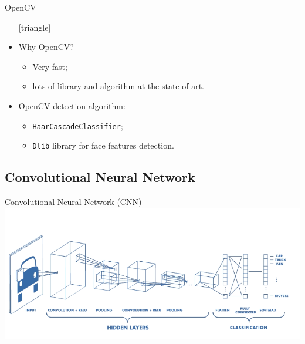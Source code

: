 \documentclass{beamer}
\begin{document}
\begin{frame}{OpenCV}
	\begin{itemize}
		\setlength\itemsep{1em}
		[triangle]
		\item
			Why OpenCV?
			\begin{itemize}
				[circle]
				\item 
					Very fast;
				\item 
					lots of library and algorithm at the state-of-art.
			\end{itemize}
		\item 
			OpenCV detection algorithm:
			\begin{itemize}
				[circle]
				\item 
					\texttt{HaarCascadeClassifier};
				\item 
					\texttt{Dlib} library for face features detection.
			\end{itemize}
	\end{itemize}
\end{frame}




\subsection{Convolutional Neural Network}

\begin{frame}{Convolutional Neural Network (CNN)}
	\includegraphics[scale=0.45]{CNN}
\end{frame}
\end{document}
